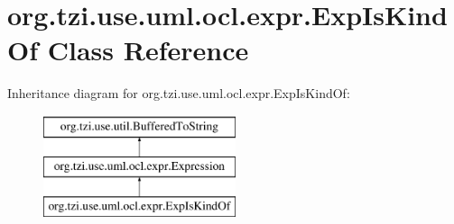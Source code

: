 \hypertarget{classorg_1_1tzi_1_1use_1_1uml_1_1ocl_1_1expr_1_1_exp_is_kind_of}{\section{org.\-tzi.\-use.\-uml.\-ocl.\-expr.\-Exp\-Is\-Kind\-Of Class Reference}
\label{classorg_1_1tzi_1_1use_1_1uml_1_1ocl_1_1expr_1_1_exp_is_kind_of}
}
Inheritance diagram for org.\-tzi.\-use.\-uml.\-ocl.\-expr.\-Exp\-Is\-Kind\-Of\-:\begin{figure}[H]
\begin{center}
\leavevmode
\includegraphics[height=3.000000cm]{classorg_1_1tzi_1_1use_1_1uml_1_1ocl_1_1expr_1_1_exp_is_kind_of}
\end{center}
\end{figure}
